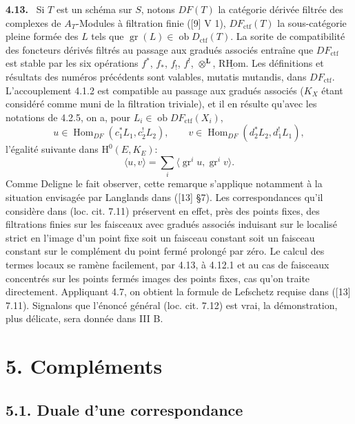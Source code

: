 \documentclass[11pt]{article}
\newenvironment{statement}[1]{\par\medskip\noindent\textbf{#1.}\ }{\par\medskip}
\renewcommand{\H}{\mathrm{H}}
\DeclareMathOperator{\Hom}{Hom}
\newcommand{\ob}{\operatorname{ob}}
\providecommand{\RHom}{\mathrm{RHom}}
\providecommand{\uRHom}{\underline{\RHom}}
\providecommand{\Dctf}{D_{\mathrm{ctf}}}
\providecommand{\ctf}{\mathrm{ctf}}
\providecommand{\gr}{\operatorname{gr}}
\providecommand{\Dctf}{D_{\mathrm{ctf}}}
\providecommand{\RHom}{\mathrm{RHom}}
\providecommand{\Hom}{\operatorname{Hom}}
\providecommand{\ob}{\operatorname{ob}}
\providecommand{\gr}{\operatorname{gr}}
\providecommand{\gr}{\operatorname{gr}}
\providecommand{\RHom}{\mathrm R\mathcal{H}om}
\providecommand{\RHom}{\mathrm{RHom}}
\providecommand{\Hom}{\operatorname{Hom}}
\begin{document}
\begin{statement}{4.13}
Si $T$ est un schéma sur $S$, notons $DF(T)$ la catégorie dérivée filtrée des complexes de $A_T$-Modules à filtration finie ([9] V 1), $DF_{\ctf}(T)$ la sous-catégorie pleine formée des $L$ tels que $\gr(L)\in\ob\Dctf(T)$. La sorite de compatibilité des foncteurs dérivés filtrés au passage aux gradués associés entraîne que $DF_{\ctf}$ est stable par les six opérations $f^*$, $f_*$, $f_!$, $f^!$, $\otimes^{\mathbf L}$, $\uRHom$. Les définitions et résultats des numéros précédents sont valables, mutatis mutandis, dans $DF_{\ctf}$. L'accouplement 4.1.2 est compatible au passage aux gradués associés ($K_X$ étant considéré comme muni de la filtration triviale), et il en résulte qu'avec les notations de 4.2.5, on a, pour $L_i\in\ob DF_{\ctf}(X_i)$,
\[
u\in\Hom_{DF}(c_1^*L_1,c_2^!L_2),\qquad
v\in\Hom_{DF}(d_2^*L_2,d_1^!L_1),
\]
l'égalité suivante dans $\H^0(E,K_E)$:
\begin{equation}
\tag{4.13.1}
\langle u,v\rangle=\sum_i\langle \gr^i u,\gr^i v\rangle.
\end{equation}
Comme Deligne le fait observer, cette remarque s'applique notamment à la situation envisagée par Langlands dans ([13] §7). Les correspondances qu'il considère dans (loc. cit. 7.11) préservent en effet, près des points fixes, des filtrations finies sur les faisceaux avec gradués associés induisant sur le localisé strict en l'image d'un point fixe soit un faisceau constant soit un faisceau constant sur le complément du point fermé prolongé par zéro. Le calcul des termes locaux se ramène facilement, par 4.13, à 4.12.1 et au cas de faisceaux concentrés sur les points fermés images des points fixes, cas qu'on traite directement. Appliquant 4.7, on obtient la formule de Lefschetz requise dans ([13] 7.11). Signalons que l'énoncé général (loc. cit. 7.12) est vrai, la démonstration, plus délicate, sera donnée dans III B.
\end{statement}



\section*{5. Compléments}

\subsection*{5.1. Duale d'une correspondance}
\end{document}
